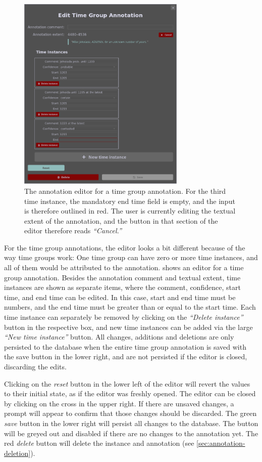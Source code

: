 \begin{figure}[htb]
  \centering
  \includegraphics[width=8cm]{../src/assets/annotator-documentation/edit-timegroup-annotation.png}
  \caption{
    The annotation editor for a time group annotation.
    For the third time instance, the mandatory end time field is empty, and the input is therefore outlined in red.
    The user is currently editing the textual extent of the annotation, and the button in that section of the editor therefore reads \emph{\enquote{Cancel.}}
  }
  \label{fig:edit-timegroup-annotation}
\end{figure}

For the time group annotations, the editor looks a bit different because of the way time groups work:
One time group can have zero or more time instances, and all of them would be attributed to the annotation.
 shows an editor for a time group annotation.
Besides the annotation comment and textual extent, time instances are shown as separate items, where the comment, confidence, start time, and end time can be edited.
In this case, start and end time must be numbers, and the end time must be greater than or equal to the start time.
Each time instance can separately be removed by clicking on the \emph{\enquote{Delete instance}} button in the respective box, and new time instances can be added via the large \emph{\enquote{New time instance}} button.
All changes, additions and deletions are only persisted to the database when the entire time group annotation is saved with the save button in the lower right, and are not persisted if the editor is closed, discarding the edits.

Clicking on the \emph{reset} button in the lower left of the editor will revert the values to their initial state, as if the editor was freshly opened.
The editor can be closed by clicking on the cross in the upper right.
If there are unsaved changes, a prompt will appear to confirm that those changes should be discarded.
The green \emph{save} button in the lower right will persist all changes to the database.
The button will be greyed out and disabled if there are no changes to the annotation yet.
The red \emph{delete} button will delete the instance and annotation (see \cref{sec:annotation-deletion}).

